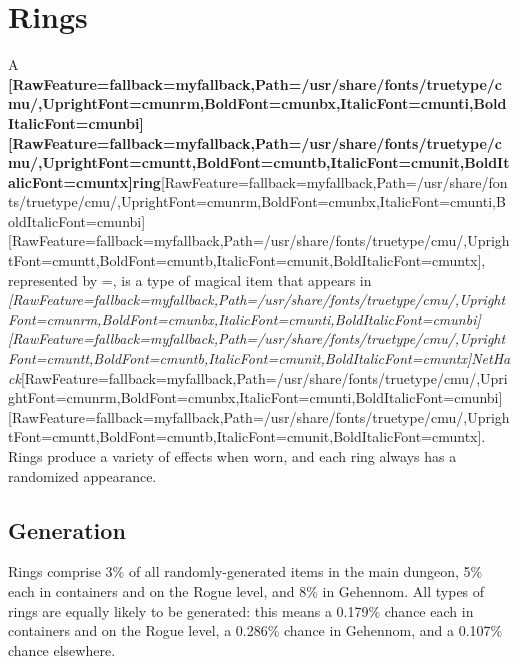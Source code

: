 \chapter{Rings}
A {\bfseries \allowbreak{}\setmainfont{cmunbx.ttf}[RawFeature={fallback=myfallback},Path=/usr/share/fonts/truetype/cmu/,UprightFont=cmunrm,BoldFont=cmunbx,ItalicFont=cmunti,BoldItalicFont=cmunbi]\setmonofont{cmunbx.ttf}[RawFeature={fallback=myfallback},Path=/usr/share/fonts/truetype/cmu/,UprightFont=cmuntt,BoldFont=cmuntb,ItalicFont=cmunit,BoldItalicFont=cmuntx]\bfseries ring}\allowbreak{}\setmainfont{cmunrm.ttf}[RawFeature={fallback=myfallback},Path=/usr/share/fonts/truetype/cmu/,UprightFont=cmunrm,BoldFont=cmunbx,ItalicFont=cmunti,BoldItalicFont=cmunbi]\setmonofont{cmunrm.ttf}[RawFeature={fallback=myfallback},Path=/usr/share/fonts/truetype/cmu/,UprightFont=cmuntt,BoldFont=cmuntb,ItalicFont=cmunit,BoldItalicFont=cmuntx], represented by =, is a type of magical item\footnotemark[16] that appears in {\itshape \allowbreak{}\setmainfont{cmunti.ttf}[RawFeature={fallback=myfallback},Path=/usr/share/fonts/truetype/cmu/,UprightFont=cmunrm,BoldFont=cmunbx,ItalicFont=cmunti,BoldItalicFont=cmunbi]\setmonofont{cmunti.ttf}[RawFeature={fallback=myfallback},Path=/usr/share/fonts/truetype/cmu/,UprightFont=cmuntt,BoldFont=cmuntb,ItalicFont=cmunit,BoldItalicFont=cmuntx]\itshape NetHack\footnotemark[17]}\allowbreak{}\setmainfont{cmunrm.ttf}[RawFeature={fallback=myfallback},Path=/usr/share/fonts/truetype/cmu/,UprightFont=cmunrm,BoldFont=cmunbx,ItalicFont=cmunti,BoldItalicFont=cmunbi]\setmonofont{cmunrm.ttf}[RawFeature={fallback=myfallback},Path=/usr/share/fonts/truetype/cmu/,UprightFont=cmuntt,BoldFont=cmuntb,ItalicFont=cmunit,BoldItalicFont=cmuntx]. Rings produce a variety of effects when worn, and each ring always has a randomized appearance\footnotemark[18].

\section{Generation}
\label{1}
Rings comprise 3\% of all randomly-{}generated items in the main dungeon, 5\% each in containers\footnotemark[19] and on the Rogue level\footnotemark[20], and 8\% in Gehennom\footnotemark[21]. All types of rings are equally likely to be generated: this means a 0.179\% chance each in containers and on the Rogue level, a 0.286\% chance in Gehennom, and a 0.107\% chance elsewhere.


